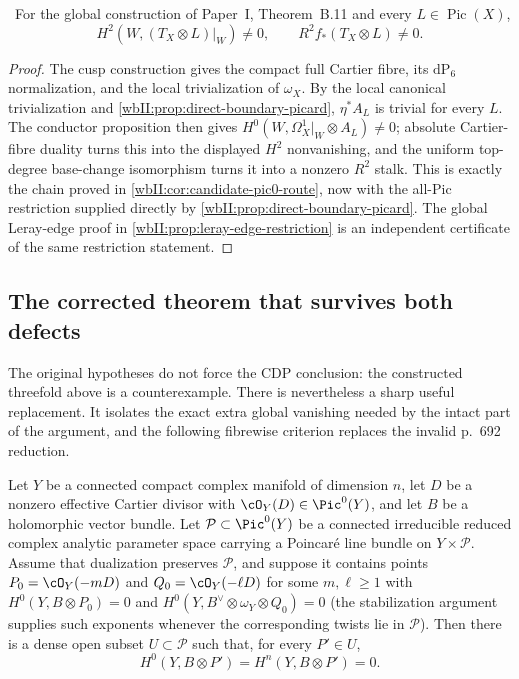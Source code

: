\begin{corollary}
\label{wbII:cor:candidate-conductor-actual}
\ For the global construction of
Paper~I, Theorem~B.11 and every
$L\in\operatorname{Pic}(X)$,
\[
H^2(W,(T_X\otimes L)|_W)\ne0,
\qquad R^2f_*(T_X\otimes L)\ne0.
\]
\end{corollary}

\begin{proof}
The cusp construction gives the compact full Cartier fibre, its
$\mathrm{dP}_6$ normalization, and the local trivialization of $\omega_X$.
By the local canonical trivialization and
\cref{wbII:prop:direct-boundary-picard}, $\eta^*A_L$ is trivial for every $L$.
The conductor proposition then gives
$H^0(W,\Omega_X^1|_W\otimes A_L)\ne0$; absolute Cartier-fibre duality turns
this into the displayed $H^2$ nonvanishing, and the uniform top-degree
base-change isomorphism turns it into a nonzero $R^2$ stalk.  This is exactly
the chain proved in \cref{wbII:cor:candidate-pic0-route}, now with the all-Pic
restriction supplied directly by \cref{wbII:prop:direct-boundary-picard}.  The
global Leray-edge proof in \cref{wbII:prop:leray-edge-restriction} is an
independent certificate of the same restriction statement.
\end{proof}

\subsection{The corrected theorem that survives both defects}

The original hypotheses do not force the CDP conclusion: the constructed
threefold above is a counterexample.  There is nevertheless a sharp useful
replacement.  It isolates the exact extra global vanishing needed by the
intact part of the argument, and the following fibrewise criterion replaces
the invalid p.~692 reduction.

\begin{lemma}
\label{wbII:lem:generic-endpoints}
Let $Y$ be a connected compact complex manifold of dimension $n$, let $D$ be
a nonzero effective Cartier divisor with $\cO_Y(D)\in\Pic^0(Y)$, and let
$B$ be a holomorphic vector bundle.  Let $\mathcal P\subset\Pic^0(Y)$ be a
connected irreducible reduced complex analytic parameter space carrying a
Poincar\'e line bundle on $Y\times\mathcal P$.  Assume that dualization
preserves $\mathcal P$, and suppose it
  contains points $P_0=\cO_Y(-mD)$ and $Q_0=\cO_Y(-\ell D)$ for some
  $m,\ell\ge1$ with
  $H^0(Y,B\otimes P_0)=0$ and
  $H^0(Y,B^\vee\otimes\omega_Y\otimes Q_0)=0$ (the stabilization argument
  supplies such exponents whenever the corresponding twists lie in
  $\mathcal P$).  Then there is a dense open subset
$U\subset\mathcal P$ such that, for every $P'\in U$,
\[
 H^0(Y,B\otimes P')=H^n(Y,B\otimes P')=0.
 \tag{W.169}\label{wbII:eq:CN:5.2}
\]
\end{lemma}

